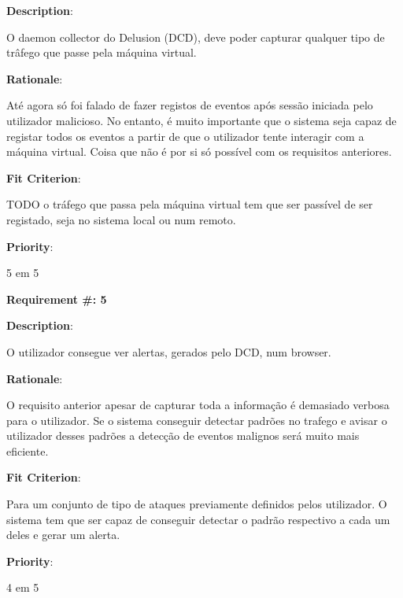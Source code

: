 \begin{description}
\item \textbf{Description}:

O daemon collector do Delusion (DCD), deve poder capturar qualquer tipo de trâfego que passe pela máquina virtual.

\item \textbf{Rationale}:

Até agora só foi falado de fazer registos de eventos após sessão iniciada pelo utilizador malicioso. No entanto, é muito importante
que o sistema seja capaz de registar todos os eventos a partir de que o utilizador tente interagir com a máquina virtual. Coisa que não é por si 
só possível com os requisitos anteriores.

\item \textbf{Fit Criterion}:

TODO o tráfego que passa pela máquina virtual tem que ser passível de ser registado, seja no sistema local ou num remoto.

\item \textbf{Priority}:

5 em 5

\end{description}

\pagebreak





\begin{minipage}{0.55\textwidth}
\begin{flushleft}\textbf{Requirement \#: 5}\end{flushleft}
\end{minipage}
\begin{minipage}{0.4\textwidth}
\end{minipage}

\begin{description}
\item \textbf{Description}:

O utilizador consegue ver alertas, gerados pelo DCD, num browser.

\item \textbf{Rationale}:

O requisito anterior apesar de capturar toda a informação é demasiado verbosa para o utilizador. Se o sistema conseguir detectar padrões no 
trafego e avisar o utilizador desses padrões a detecção de eventos malignos será muito mais eficiente.

\item \textbf{Fit Criterion}:

Para um conjunto de tipo de ataques previamente definidos pelos utilizador. O sistema tem que ser capaz de conseguir detectar o padrão respectivo
a cada um deles e gerar um alerta.

\item \textbf{Priority}:

4 em 5

\end{description}

